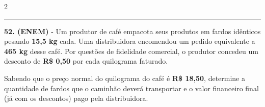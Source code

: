\documentclass[twoside, 10pt, a4paper]{article}
\newlength{\espacoPreQuestao}
\newlength{\espacoQuestao}
\begin{document}
\begin{multicols*}{2}
\noindent\textcolor{CorLinha}{\rule{\linewidth}{0.5pt}} 
\par\vspace{\espacoPreQuestao}
\textbf{52. (ENEM)} - Um produtor de café empacota seus produtos em fardos idênticos pesando \textbf{15,5 kg} cada. Uma distribuidora encomendou um pedido equivalente a \textbf{465 kg} desse café. Por questões de fidelidade comercial, o produtor concedeu um desconto de \textbf{R\$ 0,50} por cada quilograma faturado.

Sabendo que o preço normal do quilograma do café é \textbf{R\$ 18,50}, determine a quantidade de fardos que o caminhão deverá transportar e o valor financeiro final (já com os descontos) pago pela distribuidora.
\par\vspace{\espacoQuestao}

\end{multicols*}
\end{document}
